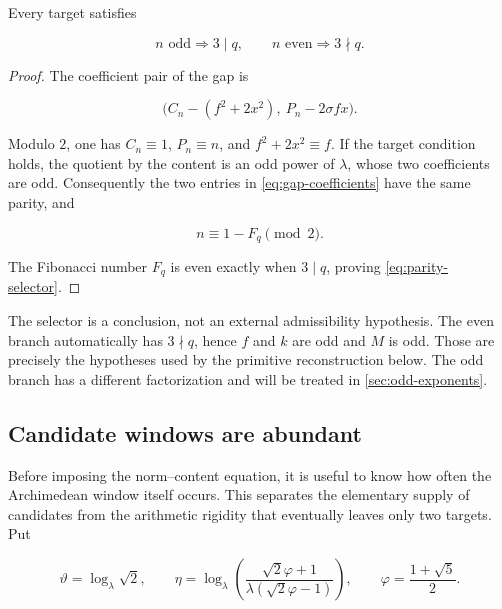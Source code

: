\begin{proposition}
\label{prop:parity-selector}
Every target satisfies

\begin{equation}
 n\text{ odd}\Longrightarrow3\mid q,
 \qquad
 n\text{ even}\Longrightarrow3\nmid q.
 \label{eq:parity-selector}
\end{equation}
\end{proposition}

\begin{proof}
The coefficient pair of the gap is

\begin{equation}
 \bigl(C_n-(f^2+2x^2),\ P_n-2\sigma fx\bigr).
 \label{eq:gap-coefficients}
\end{equation}

Modulo $2$, one has $C_n\equiv1$, $P_n\equiv n$, and
$f^2+2x^2\equiv f$. If the target condition holds, the quotient by the
content is an odd power of $\lambda$, whose two coefficients are odd.
Consequently the two entries in \cref{eq:gap-coefficients} have the same
parity, and

\begin{equation}
 n\equiv1-F_q\pmod2.
\end{equation}

The Fibonacci number $F_q$ is even exactly when $3\mid q$, proving
\cref{eq:parity-selector}.
\end{proof}

The selector is a conclusion, not an external admissibility hypothesis. The
even branch automatically has $3\nmid q$, hence $f$ and $k$ are odd and
$M$ is odd. Those are precisely the hypotheses used by the primitive
reconstruction below. The odd branch has a different factorization and will
be treated in \cref{sec:odd-exponents}.

\subsection{Candidate windows are abundant}

Before imposing the norm--content equation, it is useful to know how often
the Archimedean window itself occurs. This separates the elementary supply
of candidates from the arithmetic rigidity that eventually leaves only two
targets. Put

\begin{equation}
 \vartheta=\log_\lambda\sqrt2,
 \qquad
 \eta=\log_\lambda\left(
  \frac{\sqrt2\varphi+1}{\lambda(\sqrt2\varphi-1)}
 \right),
 \qquad
 \varphi=\frac{1+\sqrt5}{2}.
 \label{eq:window-phases}
\end{equation}

